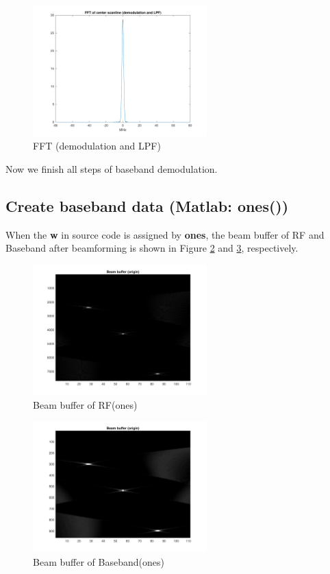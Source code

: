 \documentclass{article}
\begin{document}
\begin{figure}[H]
    \centering
    \includegraphics[width=0.6\textwidth]{src/RF/b-7.pdf}
    \caption{FFT (demodulation and LPF)}
    \label{fig:RF-fft-shift-LPF}
\end{figure}
Now we finish all steps of baseband demodulation.

\subsection{Create baseband data (Matlab: ones())}
When the \textbf{w} in source code is assigned by \textbf{ones}, the beam buffer of RF and Baseband after beamforming is shown in
Figure \ref{fig:RF-ones} and \ref{fig:Base-ones}, respectively.
\begin{figure}[H]
    \centering
    \includegraphics[width=0.6\textwidth]{src/RF/b-3-ones.pdf}
    \caption{Beam buffer of RF(ones)}
    \label{fig:RF-ones}
\end{figure}
\begin{figure}[H]
    \centering
    \includegraphics[width=0.6\textwidth]{src/Base/b-4-ones.pdf}
    \caption{Beam buffer of Baseband(ones)}
    \label{fig:Base-ones}
\end{figure}
\end{document}
